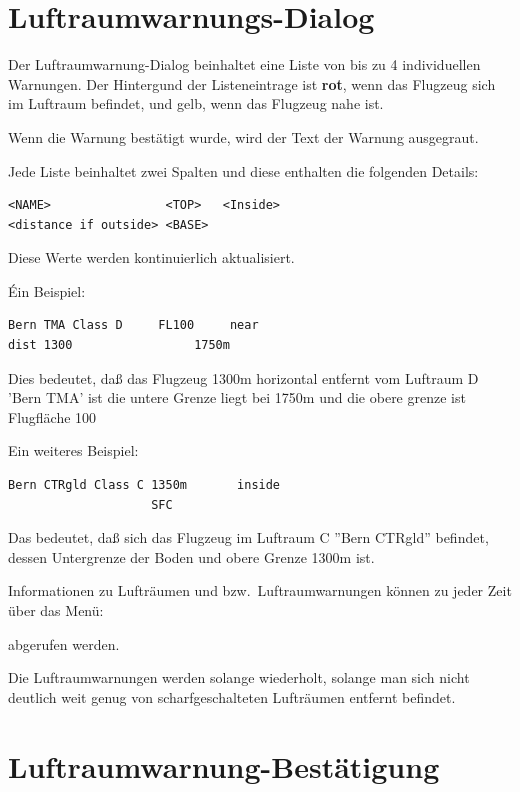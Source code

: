 \section{Luftraumwarnungs-Dialog}

Der Luftraumwarnung-Dialog beinhaltet eine Liste von bis zu 4 individuellen  Warnungen.
Der Hintergund der Listeneintrage ist \textcolor[rgb]{0.97,0.17,0.19}{\textbf{rot}}, wenn das Flugzeug
sich im Luftraum befindet, und gelb, wenn das Flugzeug nahe ist.

Wenn die Warnung bestätigt wurde, wird der Text der Warnung ausgegraut.

Jede Liste beinhaltet zwei Spalten  und diese enthalten die folgenden Details:



\begin{verbatim}
<NAME>                <TOP>   <Inside>
<distance if outside> <BASE>
\end{verbatim}

Diese Werte werden kontinuierlich aktualisiert.

Éin Beispiel:

\begin{verbatim}
Bern TMA Class D     FL100     near
dist 1300                 1750m
\end{verbatim}

Dies bedeutet, daß das Flugzeug 1300m horizontal
entfernt vom Luftraum D 'Bern TMA'  ist die untere Grenze liegt bei
1750m und die obere grenze ist Flugfläche 100



Ein weiteres Beispiel:
\begin{verbatim}
Bern CTRgld Class C 1350m	    inside
                    SFC
\end{verbatim}

Das bedeutet, daß sich das Flugzeug im Luftraum C ''Bern CTRgld'' befindet,
dessen Untergrenze der Boden und obere Grenze 1300m ist.

Informationen  zu Lufträumen und  bzw.\  Luftraumwarnungen  können zu jeder
Zeit  über das Menü:

\blink{}\blink{}

abgerufen werden.

Die Luftraumwarnungen werden solange wiederholt, solange man sich
nicht deutlich weit genug von scharfgeschalteten Lufträumen entfernt befindet.

\section{Luftraumwarnung-Bestätigung}


